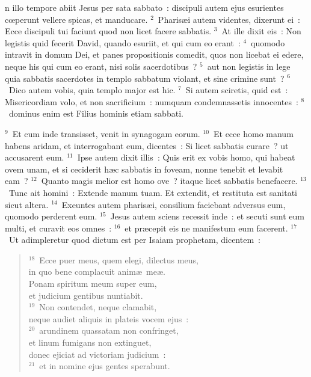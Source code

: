 \bchapter
{}n illo tempore abiit Jesus per sata sabbato~: discipuli autem ejus esurientes cœperunt vellere spicas, et manducare.
${}^{2}$~Pharis\ae i autem videntes, dixerunt ei~: Ecce discipuli tui faciunt quod non licet facere sabbatis.
${}^{3}$~At ille dixit eis~: Non legistis quid fecerit David, quando esuriit, et qui cum eo erant~:
${}^{4}$~quomodo intravit in domum Dei, et panes propositionis comedit, quos non licebat ei edere, neque his qui cum eo erant, nisi solis sacerdotibus~?
${}^{5}$~aut non legistis in lege quia sabbatis sacerdotes in templo sabbatum violant, et sine crimine sunt~?
${}^{6}$~Dico autem vobis, quia templo major est hic.
${}^{7}$~Si autem sciretis, quid est~: Misericordiam volo, et non sacrificium~: numquam condemnassetis innocentes~:
${}^{8}$~dominus enim est Filius hominis etiam sabbati.


${}^{9}$~Et cum inde transisset, venit in synagogam eorum.
${}^{10}$~Et ecce homo manum habens aridam, et interrogabant eum, dicentes~: Si licet sabbatis curare~? ut accusarent eum.
${}^{11}$~Ipse autem dixit illis~: Quis erit ex vobis homo, qui habeat ovem unam, et si ceciderit h\ae c sabbatis in foveam, nonne tenebit et levabit eam~?
${}^{12}$~Quanto magis melior est homo ove~? itaque licet sabbatis benefacere.
${}^{13}$~Tunc ait homini~: Extende manum tuam. Et extendit, et restituta est sanitati sicut altera.
${}^{14}$~Exeuntes autem pharis\ae i, consilium faciebant adversus eum, quomodo perderent eum.
${}^{15}$~Jesus autem sciens recessit inde~: et secuti sunt eum multi, et curavit eos omnes~:
${}^{16}$~et pr\ae cepit eis ne manifestum eum facerent.
${}^{17}$~Ut adimpleretur quod dictum est per Isaiam prophetam, dicentem~:
\begin{flushleft}\begin{verse}${}^{18}$~Ecce puer meus, quem elegi, dilectus meus,\\ in quo bene complacuit anim\ae\ me\ae .\\ Ponam spiritum meum super eum,\\ et judicium gentibus nuntiabit.\\
${}^{19}$~Non contendet, neque clamabit,\\ neque audiet aliquis in plateis vocem ejus~:\\
${}^{20}$~arundinem quassatam non confringet,\\ et linum fumigans non extinguet,\\ donec ejiciat ad victoriam judicium~:\\
${}^{21}$~et in nomine ejus gentes sperabunt.\end{verse}\end{flushleft}



